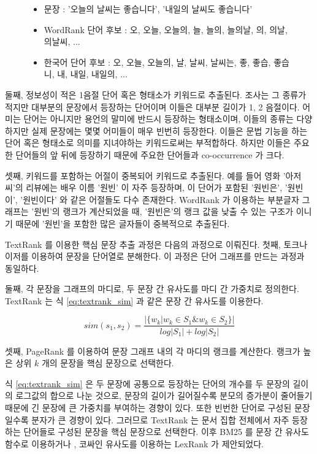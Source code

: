 \documentclass[11pt]{article}
\begin{document}
\begin{figure}
\label{fig:krwordrank_candidates}
\begin{itemize}[noitemsep]
  \item 문장 : '오늘의 날씨는 좋습니다', '내일의 날씨도 좋습니다'
  \item WordRank 단어 후보 : 오, 오늘, 오늘의, 늘, 늘의, 늘의날, 의, 의날, 의날씨, ...
  \item 한국어 단어 후보 : 오, 오늘, 오늘의, 날, 날씨, 날씨는, 좋, 좋습, 좋습니, 내, 내일, 내일의, ...
\end{itemize}
\end{figure}

둘째, 정보성이 적은 1음절 단어 혹은 형태소가 키워드로 추출된다.
조사는 그 종류가 적지만 대부분의 문장에서 등장하는 단어이며 이들은 대부분 길이가 1, 2 음절이다.
어미는 단어는 아니지만 용언의 말미에 반드시 등장하는 형태소이며, 이들의 종류는 다양하지만 실제 문장에는 몇몇 어미들이 매우 빈번히 등장한다.
이들은 문법 기능을 하는 단어 혹은 형태소로 의미를 지녀야하는 키워드로써는 부적합하다.
하지만 이들은 주요한 단어들의 앞 뒤에 등장하기 때문에 주요한 단어들과 co-occurrence 가 크다.

셋째, 키워드를 포함하는 어절이 중복되어 키워드로 추출된다.
예를 들어 영화 '아저씨'의 리뷰에는 배우 이름 '원빈' 이 자주 등장하며, 이 단어가 포함된 '원빈은', '원빈이', '원빈이다' 와 같은 어절들도 다수 존재한다.
WordRank 가 이용하는 부분글자 그래프는 '원빈'의 랭크가 계산되었을 때, '원빈은'의 랭크 값을 낮출 수 있는 구조가 이니기 때문에 '원빈'을 포함한 많은 글자들이 중복적으로 추출된다.

TextRank 를 이용한 핵심 문장 추출 과정은 다음의 과정으로 이뤄진다.
첫째, 토크나이저를 이용하여 문장을 단어열로 분해한다.
이 과정은 단어 그래프를 만드는 과정과 동일하다.

둘째, 각 문장을 그래프의 마디로, 두 문장 간 유사도를 마디 간 가중치로 정의한다.
TextRank 는 식 \ref{eq:textrank_sim} 과 같은 문장 간 유사도를 이용한다.

\begin{equation}
\label{eq:textrank_sim}
sim(s_1, s_2) = \frac{\vert \{ w_k \vert w_k \in S_1 \& w_k \in S_2 \} \vert}{log \vert S_1 \vert + log \vert S_2 \vert}
\end{equation}

셋째, PageRank \citep{ilprints422} 를 이용하여 문장 그래프 내의 각 마디의 랭크를 계산한다.
랭크가 높은 상위 $k$ 개의 문장을 핵심 문장으로 선택한다.

식 \ref{eq:textrank_sim} 은 두 문장에 공통으로 등장하는 단어의 개수를 두 문장의 길이의 로그값의 합으로 나눈 것으로, 문장의 길이가 길어질수록 분모의 증가분이 줄어들기 때문에 긴 문장에 큰 가중치를 부여하는 경향이 있다.
또한 빈번한 단어로 구성된 문장일수록 분자가 큰 경향이 있다.
그러므로 TextRank 는 문서 집합 전체에서 자주 등장하는 단어들로 구성된 문장을 핵심 문장으로 선택한다.
이후 BM25 \citep{robertson2009probabilistic} 를 문장 간 유사도 함수로 이용하거나 \citep{barrios2016variations}, 코싸인 유사도를 이용하는 LexRank \citep{erkan2004lexrank} 가 제안되었다.
\end{document}
